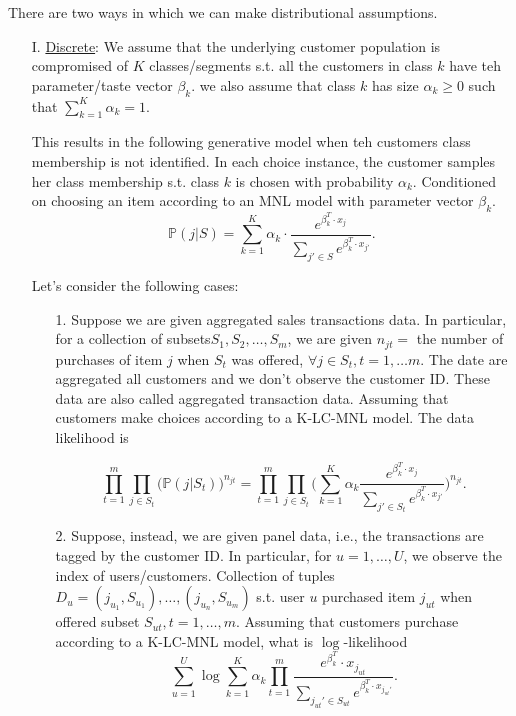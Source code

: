 \documentclass[11pt]{article}
\begin{document}
There are two ways in which we can make distributional assumptions.
\begin{itemize}
    \item[I.] \underline{Discrete}: We assume that the underlying customer population is compromised of $K$ classes/segments s.t. all the customers in class $k$ have teh parameter/taste vector $\beta_k$. we also assume that class $k$ has size $\alpha_k \geq 0$ such that $\sum\limits_{k=1}^{K} \alpha_k= 1$.
    
    This results in the following generative model when teh customers class membership is not identified.
    In each choice instance, the customer samples her class membership s.t. class $k$ is chosen with probability $\alpha_k$. Conditioned on choosing an item according to an MNL model with parameter vector $\beta_k$. 
    $$
    \mathbb{P}(j|S) = \sum\limits_{k=1}^K \alpha_k\cdot\frac{e^{\beta_k^T\cdot x_j}}{\sum_{j'\in S}e^{\beta_k^T\cdot x_{j'}}}.
    $$
    
    Let's consider the following cases:
    
\begin{itemize}
    \item[1.] Suppose we are given aggregated sales transactions data. In particular, for a collection of subsets$S_1,S_2,\ldots,S_m$, we are given $n_{jt} = $ the number of purchases of item $j$ when $S_t$ was offered, $\forall j \in S_t, t=1,\ldots m$.
    The date are aggregated all customers and we don't observe the customer ID. These data are also called aggregated transaction data.
    Assuming that customers make choices according to a K-LC-MNL model.
    The data likelihood is 
    
    $$
    \prod\limits_{t=1}^m \prod_{j\in S_t}\big(\mathbb{P}(j|S_t)\big)^{n_{jt}} = 
    \prod\limits_{t=1}^m \prod_{j\in S_t}\bigg(\sum\limits_{k=1}^K \alpha_k \frac{e^{\beta_k^T\cdot x_j}}{\sum_{j' \in S_t} e^{\beta_k^T\cdot x_{j'}}}\bigg)^{n_{jt}}.
    $$
    \item[2.] Suppose, instead, we are given panel data, i.e., the transactions are tagged by the customer ID. In particular, for $u=1,\ldots,U$, we observe the index of users/customers. Collection of tuples $D_u = {(j_{u_1},S_{u_1}),\ldots,(j_{u_n},S_{u_m})}$ s.t. user $u$ purchased item $j_{ut}$ when offered subset $S_{ut}, t=1,\ldots,m.$
    Assuming that customers purchase according to a K-LC-MNL model, what is $\log$-likelihood
    $$
    \sum\limits_{u=1}^U \log \sum\limits_{k=1}^K \alpha_k \prod_{t=1}^m\frac{e^{\beta_k^T}\cdot x_{j_{ut}}}{\sum\limits_{j_{ut}'\in S_{ut}}e^{\beta_k^T\cdot x_{j_{ut}'}}}.
    $$
     
    
    
\end{itemize}
    

\end{itemize}
\end{document}
